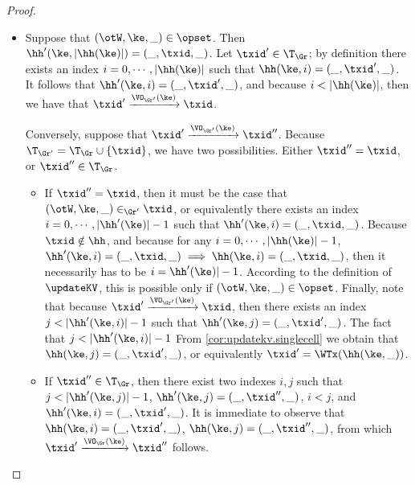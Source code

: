 \begin{proof}
\begin{enumerate}
\begin{itemize}
\item Suppose that $(\otW, \ke, \_) \in \opset$. Then $\hh'(\ke, \lvert \hh(\ke) \rvert) = (\_, \txid, \_)$.
Let $\txid' \in \T_{\Gr}$; by definition there exists an index $i = 0,\cdots, \lvert \hh(\ke) \rvert$ 
such that $\hh(\ke, i) = (\_, \txid', \_)$. It follows that $\hh'(\ke, i) = (\_, \txid', \_)$, and 
because $i < \lvert \hh(\ke) \rvert$, then we have that $\txid' \xrightarrow{\VO_{\Gr'}(\ke)} \txid$. 

Conversely, suppose that $\txid' \xrightarrow{\VO_{\Gr'}(\ke)} \txid''$. Because 
$\T_{\Gr'} = \T_{\Gr} \cup \{ \txid \}$, we have two possibilities. Either $\txid'' = \txid$, 
or $\txid'' \in \T_{\Gr}$. 

\begin{itemize}
\item If $\txid'' = \txid$, then it must be the case that $(\otW, \ke, \_) \in_{\Gr'} \txid$, 
or equivalently there exists an index $i=0,\cdots, \lvert \hh'(\ke) \rvert -1 $ such that 
$\hh'(\ke, i) = (\_, \txid, \_)$. Because $\txid \notin \hh$, and because for any 
$i = 0, \cdots, \lvert \hh(\ke) \rvert - 1$, $\hh'(\ke, i) = (\_, \txid, \_) \implies 
\hh(\ke, i) = (\_, \txid, \_)$, then it necessarily has to be $i = \hh'(\ke) \rvert - 1$. 
According to the definition of $\updateKV$, this is possible only if $(\otW,\ke, \_) \in \opset$. 
Finally, note that because $\txid' \xrightarrow{\VO_{\Gr'}(\ke)} \txid$, then 
there exists an index $j < \lvert \hh'(\ke, i) \rvert - 1$ such that 
$\hh'(\ke, j) = (\_, \txid' ,\_)$. The fact that $j < \lvert \hh'(\ke, i) \rvert - 1$ 
From \cref{cor:updatekv.singlecell} we obtain that $\hh(\ke, j) = (\_, \txid', \_)$, 
or equivalently $\txid' = \WTx(\hh(\ke, \_))$. 

\item If $\txid'' \in \T_{\Gr}$, then there exist two indexes $i,j$ such that 
$j < \lvert \hh'(\ke, j) \rvert - 1$, $\hh'(\ke, j) = (\_, \txid'', \_)$, 
$i < j$, and $\hh'(\ke, i) = (\_, \txid', \_)$. It is immediate to observe 
that $\hh(\ke, i) = (\_, \txid', \_)$, $\hh(\ke, j) = (\_, \txid'', \_)$, 
from which $\txid' \xrightarrow{\VO_{\Gr}(\ke)} \txid''$ follows. 
\end{itemize}
\end{itemize}

\end{enumerate}
\end{proof}






